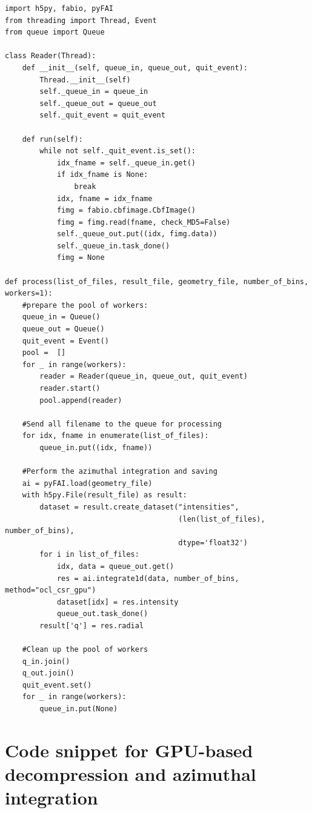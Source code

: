 \documentclass[preprint]{iucr}              %
\begin{document}
\begin{minipage}{\linewidth}
\label{poolsnippet}
\begin{verbatim}
import h5py, fabio, pyFAI
from threading import Thread, Event
from queue import Queue

class Reader(Thread):
    def __init__(self, queue_in, queue_out, quit_event):
        Thread.__init__(self)
        self._queue_in = queue_in
        self._queue_out = queue_out
        self._quit_event = quit_event

    def run(self):
        while not self._quit_event.is_set():
            idx_fname = self._queue_in.get()
            if idx_fname is None:
                break
            idx, fname = idx_fname
            fimg = fabio.cbfimage.CbfImage()
            fimg = fimg.read(fname, check_MD5=False)
            self._queue_out.put((idx, fimg.data))
            self._queue_in.task_done()
            fimg = None

def process(list_of_files, result_file, geometry_file, number_of_bins, workers=1):   
    #prepare the pool of workers:
    queue_in = Queue()
    queue_out = Queue()
    quit_event = Event()
    pool =  []
    for _ in range(workers):
        reader = Reader(queue_in, queue_out, quit_event)
        reader.start()
        pool.append(reader)
    
    #Send all filename to the queue for processing
    for idx, fname in enumerate(list_of_files):
        queue_in.put((idx, fname))

    #Perform the azimuthal integration and saving
    ai = pyFAI.load(geometry_file)
    with h5py.File(result_file) as result:
        dataset = result.create_dataset("intensities", 
                                        (len(list_of_files), number_of_bins),
                                        dtype='float32') 
        for i in list_of_files:
            idx, data = queue_out.get()
            res = ai.integrate1d(data, number_of_bins, method="ocl_csr_gpu")
            dataset[idx] = res.intensity
            queue_out.task_done()
        result['q'] = res.radial
	
	#Clean up the pool of workers
    q_in.join()
    q_out.join()
    quit_event.set()
    for _ in range(workers):
        queue_in.put(None)
\end{verbatim}
\end{minipage}

\goodbreak

\section{Code snippet for GPU-based decompression and azimuthal integration}
\end{document}
